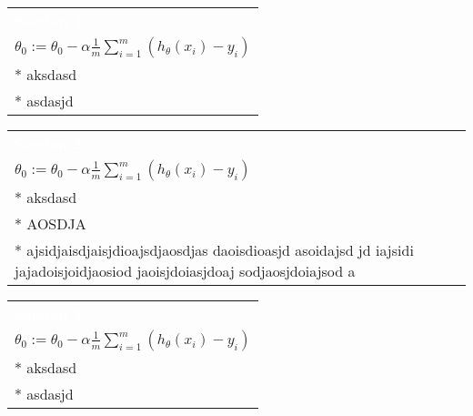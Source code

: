 \documentclass[a4paper,12pt,ngerman,fleqn]{article}
\newcommand{\mybox}[3]{
        \centering
        \begin{tabularx}{0.9\textwidth}{|X|}
            \rowcolor{accent}
            \textcolor{white}{\textbf{#1}} \\
            #2
            \\ \hline
            #3
            \\ \hline
        \end{tabularx}
    }
\begin{document}
    
    \setlength{\parindent}{0cm}


    \begin{minipage}[t]{.51\textwidth}
        \vspace{1pt}
        \mybox
            {Section 1}
            {\( \theta_0 := \theta_0 - \alpha \frac{1}{m} \sum\limits_{i=1}^{m}(h_\theta(x_{i}) - y_{i}) \)}
            {
                * aksdasd \\
                * asdasjd
            }
        \newline
        \newline
        \newline
        \mybox
            {Section 2}
            {\( \theta_0 := \theta_0 - \alpha \frac{1}{m} \sum\limits_{i=1}^{m}(h_\theta(x_{i}) - y_{i}) \)}
            {
                * aksdasd \\
                * AOSDJA \\
                * ajsidjaisdjaisjdioajsdjaosdjas daoisdioasjd asoidajsd jd iajsidi jajadoisjoidjaosiod jaoisjdoiasjdoaj sodjaosjdoiajsod a
            }
        \newline
        \newline
        \newline
        \mybox
            {Section 3}
            {\( \theta_0 := \theta_0 - \alpha \frac{1}{m} \sum\limits_{i=1}^{m}(h_\theta(x_{i}) - y_{i}) \)}
            {
                * aksdasd \\
                * asdasjd
            }
        \newline
    \end{minipage}%
\end{document}
